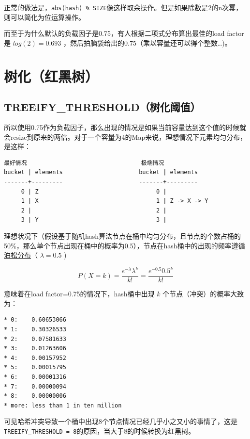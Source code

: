 \documentclass[12pt]{article}
\begin{document}
正常的做法是，\texttt{abs(hash)\ \%\ SIZE}像这样取余操作。但是如果除数是2的n次幂，则可以简化为位运算操作。

而至于为什么默认的负载因子是0.75，有人根据二项式分布算出最佳的load factor是 \(log(2)=0.693\) ，然后拍脑袋给出的0.75（乘以容量还可以得个整数\ldots)。

\section{树化（红黑树）}\label{ux6811ux5316ux7ea2ux9ed1ux6811}

\subsection{TREEIFY\_THRESHOLD（树化阈值）}\label{treeify_thresholdux6811ux5316ux9608ux503c}

所以使用0.75作为负载因子，那么出现的情况是如果当前容量达到这个值的时候就会resize到原来的两倍。对于一个容量为4的Map来说，理想情况下元素均匀分布，是这样：

\begin{verbatim}
最好情况                                 极端情况
bucket | elements                      bucket | elements     
-------+---------                      -------+---------    
     0 | Z                                  0 |   
     1 | X                                  1 | Z -> X -> Y 
     2 |                                    2 |  
     3 | Y                                  3 | 
\end{verbatim}

理想状况下（假设基于随机hash算法节点在桶中均匀分布，且节点的个数占桶的50\%，那么单个节点出现在桶中的概率为0.5），节点在hash桶中的出现的频率遵循\href{https://zh.wikipedia.org/wiki/\%E6\%B3\%8A\%E6\%9D\%BE\%E5\%88\%86\%E4\%BD\%88}{泊松分布}（ \(λ = 0.5\) )

\[
P(X=k)=\frac{e^{-\lambda}\lambda^k}{k!}=\frac{e^{-0.5}0.5^k}{k!}
\]

意味着在load factor=0.75的情况下，hash桶中出现 \(k\) 个节点（冲突）的概率大致为：

\begin{verbatim}
* 0:    0.60653066
* 1:    0.30326533
* 2:    0.07581633
* 3:    0.01263606
* 4:    0.00157952
* 5:    0.00015795
* 6:    0.00001316
* 7:    0.00000094
* 8:    0.00000006
* more: less than 1 in ten million
\end{verbatim}

可见哈希冲突导致一个桶中出现8个节点情况已经几乎小之又小的事情了，这是\texttt{TREEIFY\_THRESHOLD\ =\ 8}的原因，当大于8的时候转换为红黑树。
\end{document}
